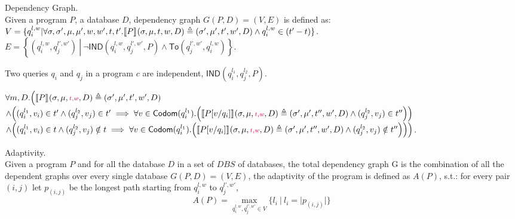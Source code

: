 \documentclass[a4paper,11pt]{article}
\begin{document}
%
%
%
\begin{defn}
Dependency Graph.
\\
Given a program $P$, a database $D$, dependency graph $G(P,D) = (V, E)$ is defined as: \\
$V =\{q_i^{l,w} |\forall \sigma, \sigma', \mu,\mu' , w, w',t, t'. \llbracket P \rrbracket_{} (\sigma, \mu , t, w, D)  \triangleq  (\sigma' , \mu' , t', w' , D)  \land q_i^{l,w} \in {(t'-t)}  \}$.
\\
$E = \left\{(q_i^{l,w},q_j^{l',w'}) 
~ \left \vert ~ \neg \mathsf{IND}(q_i^{l,w},q_j^{l',w'}, P)
\land \mathsf{To}(q_j^{l',w'}, q_i^{l,w}) \right.\right\}$.
\end{defn}
%
%
%
\begin{defn}
Two queries $q_i$ and $q_j$ in a program $c$ are independent, $\mathsf{IND}(q^{l_1}_i, q^{l_2}_j, P)$.

$\forall m, D. \Big( 
\llbracket P \rrbracket_{} (\sigma, \mu , {\scriptstyle \color{purple}{ t, w }} , D)  \triangleq  (\sigma' , \mu' , t', w' , D) 
$\\
$\land 
\left((q^{l_1}_i, v_i) \in t' \land (q^{l_2}_j, v_j) \in t'  \implies \forall v \in \textsf{Codom}(q^{l_1}_i). 
\left( \lrr{ P[v/q_i] }{} (\sigma, \mu , \jl{t, w }, D)  \triangleq  (\sigma' , \mu' , t'', w' , D)  \land (q^{l_2}_j, v_j) \in t''
\right)
\right)$
\\
$
\land 
\left( (q^{l_1}_i, v_i) \in t \land (q^{l_2}_j, v_j) \notin t  \implies \forall v \in \textsf{Codom}(q^{l_1}_i). 
\left( \lrr{ P[v/q_i] }{} (\sigma, \mu , \jl{t,w },  D)  \triangleq  (\sigma' , \mu' , t'', w' , D)  \land (q^{l_2}_j, v_j) \notin t''
\right)
\right)
\Big ) $.
\end{defn}
%
%
\begin{defn}
Adaptivity.
\\
Given a program $P$ and for all the database $D$ in a set of $DBS$ of databases, the total dependency graph G is the combination of all the dependent graphs over every single database $G(P, D) = (V, E)$, the adaptivity of the program is defined as $A(P)$, s.t.:
for every pair $(i,j)$ let $p_{(i,j)}$ be the longest path starting from $q_i^{l, w}$ to $q_j^{l',w'}$,
%
$$A(P) = \max\limits_{q_i^{l,w},q_j^{l',w'} \in V }\{l_i ~|~ l_i = |p_(i,j)| \}$$
\end{defn}
\end{document}
